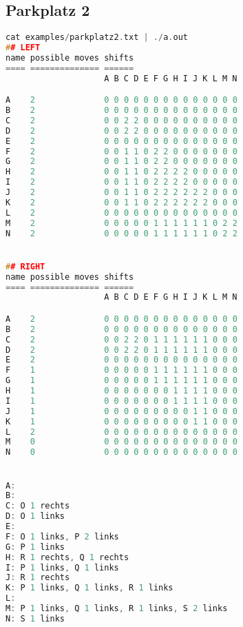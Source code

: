 \documentclass[a4paper,10pt,ngerman]{scrartcl}
\begin{document}
\subsection*{Parkplatz 2}
\begin{lstlisting}[language=C++]
cat examples/parkplatz2.txt | ./a.out
## LEFT
name possible moves shifts
==== ============== ======
                    A B C D E F G H I J K L M N

A    2              0 0 0 0 0 0 0 0 0 0 0 0 0 0
B    2              0 0 0 0 0 0 0 0 0 0 0 0 0 0
C    2              0 0 2 2 0 0 0 0 0 0 0 0 0 0
D    2              0 0 2 2 0 0 0 0 0 0 0 0 0 0
E    2              0 0 0 0 0 0 0 0 0 0 0 0 0 0
F    2              0 0 1 1 0 2 2 0 0 0 0 0 0 0
G    2              0 0 1 1 0 2 2 0 0 0 0 0 0 0
H    2              0 0 1 1 0 2 2 2 2 0 0 0 0 0
I    2              0 0 1 1 0 2 2 2 2 0 0 0 0 0
J    2              0 0 1 1 0 2 2 2 2 2 2 0 0 0
K    2              0 0 1 1 0 2 2 2 2 2 2 0 0 0
L    2              0 0 0 0 0 0 0 0 0 0 0 0 0 0
M    2              0 0 0 0 0 1 1 1 1 1 1 0 2 2
N    2              0 0 0 0 0 1 1 1 1 1 1 0 2 2


## RIGHT
name possible moves shifts
==== ============== ======
                    A B C D E F G H I J K L M N

A    2              0 0 0 0 0 0 0 0 0 0 0 0 0 0
B    2              0 0 0 0 0 0 0 0 0 0 0 0 0 0
C    2              0 0 2 2 0 1 1 1 1 1 1 0 0 0
D    2              0 0 2 2 0 1 1 1 1 1 1 0 0 0
E    2              0 0 0 0 0 0 0 0 0 0 0 0 0 0
F    1              0 0 0 0 0 1 1 1 1 1 1 0 0 0
G    1              0 0 0 0 0 1 1 1 1 1 1 0 0 0
H    1              0 0 0 0 0 0 0 1 1 1 1 0 0 0
I    1              0 0 0 0 0 0 0 1 1 1 1 0 0 0
J    1              0 0 0 0 0 0 0 0 0 1 1 0 0 0
K    1              0 0 0 0 0 0 0 0 0 1 1 0 0 0
L    2              0 0 0 0 0 0 0 0 0 0 0 0 0 0
M    0              0 0 0 0 0 0 0 0 0 0 0 0 0 0
N    0              0 0 0 0 0 0 0 0 0 0 0 0 0 0


A:
B:
C: O 1 rechts
D: O 1 links
E:
F: O 1 links, P 2 links
G: P 1 links
H: R 1 rechts, Q 1 rechts
I: P 1 links, Q 1 links
J: R 1 rechts
K: P 1 links, Q 1 links, R 1 links
L:
M: P 1 links, Q 1 links, R 1 links, S 2 links
N: S 1 links
\end{lstlisting}
\end{document}

